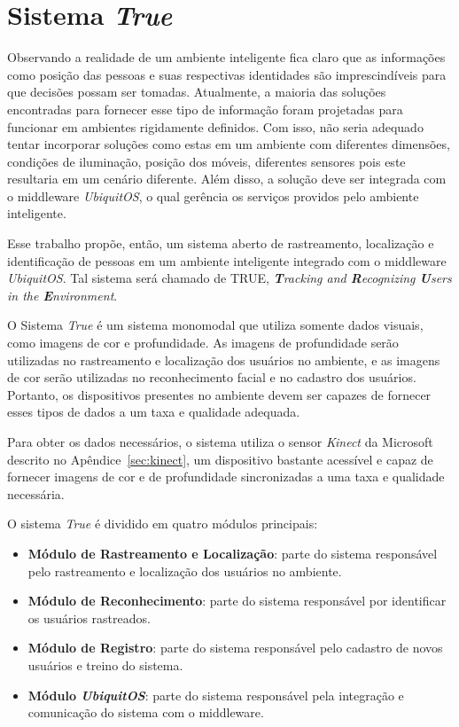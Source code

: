 \chapter{Sistema \textit{True}}

Observando a realidade de um ambiente inteligente fica claro que as informações como posição das pessoas e suas respectivas identidades são imprescindíveis para que decisões possam ser tomadas. Atualmente, a maioria das soluções encontradas para fornecer esse tipo de informação foram projetadas para funcionar em ambientes rigidamente definidos. Com isso, não seria adequado tentar incorporar soluções como estas em um ambiente com diferentes dimensões, condições de iluminação, posição dos móveis, diferentes sensores pois este resultaria em um cenário diferente. Além disso, a solução deve ser integrada com o middleware \textit{UbiquitOS}, o qual gerência os serviços providos pelo ambiente inteligente.

Esse trabalho propõe, então, um sistema aberto de rastreamento, localização e identificação de pessoas em um ambiente inteligente integrado com o middleware \textit{UbiquitOS}. Tal sistema será chamado de TRUE, \textit{\textbf{T}racking and \textbf{R}ecognizing \textbf{U}sers in the \textbf{E}nvironment}.

O Sistema \textit{True} é um sistema monomodal que utiliza somente dados visuais, como imagens de cor e profundidade. As imagens de profundidade serão utilizadas no rastreamento e localização dos usuários no ambiente, e as imagens de cor serão utilizadas no reconhecimento facial e no cadastro dos usuários. Portanto, os dispositivos presentes no ambiente devem ser capazes de fornecer esses tipos de dados a um taxa e qualidade adequada. 

Para obter os dados necessários, o sistema utiliza o sensor \textit{Kinect} da Microsoft descrito no Apêndice~\ref{sec:kinect}, um dispositivo bastante acessível e capaz de fornecer imagens de cor e de profundidade sincronizadas a uma taxa e qualidade necessária.

O sistema \textit{True} é dividido em quatro módulos principais:


	\begin{itemize}
		\item \textbf{Módulo de Rastreamento e Localização}: parte do sistema responsável pelo rastreamento e localização dos usuários no ambiente.
		\item \textbf{Módulo de Reconhecimento}: parte do sistema responsável por identificar os usuários rastreados.
		\item \textbf{Módulo de Registro}: parte do sistema responsável pelo cadastro de novos usuários e treino do sistema.
		\item \textbf{Módulo \textit{UbiquitOS}}: parte do sistema responsável pela integração e comunicação do sistema com o middleware.
	\end{itemize}

